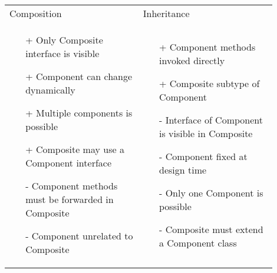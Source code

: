 \begin{table}[!ht]
    \begin{tabular}{p{0.45\linewidth}p{0.45\linewidth}}
        Composition & Inheritance \\
        \begin{minipage}{\linewidth}
            \begin{center}
                
            \end{center}

            \begin{itemize}
                \item[+] Only Composite interface is visible
                \item[+] Component can change dynamically
                \item[+] Multiple components is possible
                \item[+] Composite may use a Component
                interface
                \item[-] Component methods must be forwarded
                in Composite
                \item[-] Component unrelated to Composite
            \end{itemize}
        \end{minipage}
        &
        \begin{minipage}{\linewidth}
            \begin{center}
                
            \end{center}
            \begin{itemize}
                \item[+] Component methods invoked directly
                \item[+] Composite subtype of Component
                \item[-] Interface of Component is visible in
                Composite
                \item[-] Component fixed at design time
                \item[-] Only one Component is possible
                \item[-] Composite must extend a Component
                class
            \end{itemize}
        \end{minipage}
    \end{tabular}
\end{table}

